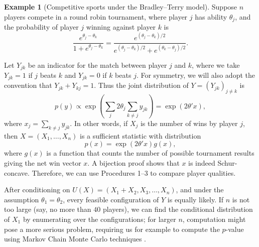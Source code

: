 \documentclass[11pt]{article}
\theoremstyle{definition}
\newtheorem{example}{Example}
\theoremstyle{custom}
\begin{document}
\begin{example}[Competitive sports under the Bradley--Terry model]
Suppose $n$ players compete in a round robin tournament, where player $j$ has ability $\theta_j$, and the probability of player $j$ winning against player $k$ is
\[\frac{e^{\theta_j - \theta_k}}{1 + e^{\theta_j - \theta_k}} = \frac{e^{\left(\theta_j - \theta_k\right) / 2}}{e^{\left(\theta_j - \theta_k\right) / 2} + e^{\left(\theta_k - \theta_j\right) / 2}}.\]

Let $Y_{jk}$ be an indicator for the match between player $j$ and $k$, where we take $Y_{jk} = 1$ if $j$ beats $k$ and $Y_{jk} = 0$ if $k$ beats $j$. For symmetry, we will also adopt the convention that $Y_{jk} + Y_{kj} = 1$. Thus the joint distribution of $Y=\left(Y_{jk}\right)_{j\neq k}$ is
\[p\left(y\right) \propto \exp\left(\sum_j 2\theta_j \sum_{k \ne j} y_{jk}\right)  = \exp\left(2\theta' x\right),\]
where $x_j = \sum_{k \ne j} y_{jk}$. In other words, if $X_j$ is the number of wins by player $j$, then $X=(X_1,\ldots,X_n)$ is a sufficient statistic with distribution
\[p\left(x\right) = \exp\left(2\theta' x\right) g\left(x\right),\]
where $g\left(x\right)$ is a function that counts the number of possible tournament results giving the net win vector $x$. A bijection proof shows that $x$ is indeed Schur-concave. Therefore, we can use Procedures 1--3 to compare player qualities.

After conditioning on $U(X) = (X_1 + X_2, X_3, \ldots, X_n)$, and under the assumption $\theta_1 = \theta_2$, every feasible configuration of $Y$ is equally likely. If $n$ is not too large (say, no more than $40$ players), we can find the conditional distribution of $X_1$ by enumerating over the configurations; for larger $n$, computation might pose a more serious problem, requiring us for example to compute the $p$-value using Markov Chain Monte Carlo techniques \citep{Besag:1989}.
\end{example}
\end{document}
